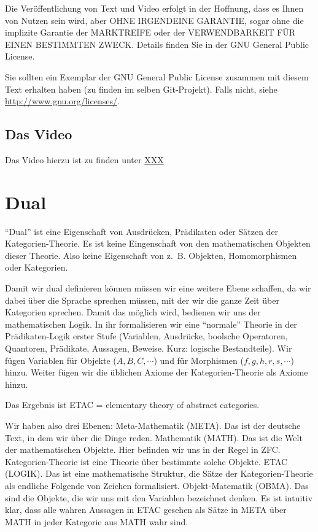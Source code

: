 \documentclass[a4paper]{amsart}
\theoremstyle{definition}
\newcommand{\zb}{z.~B. }
\begin{document}
Die Veröffentlichung von Text und Video erfolgt in der Hoffnung, dass es Ihnen von Nutzen sein wird,
aber OHNE IRGENDEINE GARANTIE, sogar ohne die implizite Garantie der MARKTREIFE oder der
VERWENDBARKEIT FÜR EINEN BESTIMMTEN ZWECK. Details finden Sie in der GNU General Public License.

Sie sollten ein Exemplar der GNU General Public License zusammen mit diesem Text erhalten haben
(zu finden im selben Git-Projekt).
Falls nicht, siehe \url{http://www.gnu.org/licenses/}.

\subsection*{Das Video}
Das Video hierzu ist zu finden unter
{\tiny
   \url{XXX}
}

\section{Dual}
"`Dual"' ist eine Eigenschaft von Ausdrücken, Prädikaten oder Sätzen der Kategorien-Theorie. Es ist keine Eingenschaft von den mathematischen Objekten dieser Theorie. Also keine Eigenschaft von \zb Objekten, Homomorphismen oder Kategorien.

Damit wir dual definieren können müssen wir eine weitere Ebene schaffen, da wir dabei über die Sprache sprechen müssen, mit der wir die ganze Zeit über Kategorien sprechen. Damit das möglich wird, bedienen wir uns der mathematischen Logik. In ihr formalisieren wir eine "`normale"' Theorie in der Prädikaten-Logik erster Stufe (Variablen, Ausdrücke, boolsche Operatoren, Quantoren, Prädikate, Aussagen, Beweise. Kurz: logische Bestandteile). Wir fügen Variablen für Objekte ($A,B,C, \cdots$) und für Morphismen ($f, g, h, r, s, \cdots$) hinzu. Weiter fügen wir die üblichen Axiome der Kategorien-Theorie als Axiome hinzu. 

Das Ergebnis ist ETAC = elementary theory of abstract categories. 

Wir haben also drei Ebenen: Meta-Mathematik (META). Das ist der deutsche Text, in dem wir über die Dinge reden. Mathematik (MATH). Das ist die Welt der mathematischen Objekte. Hier befinden wir uns in der Regel in ZFC. Kategorien-Theorie ist eine Theorie über bestimmte solche Objekte. ETAC (LOGIK). Das ist eine mathematische Struktur, die Sätze der Kategorien-Theorie als endliche Folgende von Zeichen formalisiert. Objekt-Matematik (OBMA). Das sind die Objekte, die wir uns mit den Variablen bezeichnet denken. Es ist intuitiv klar, dass alle wahren Aussagen in ETAC gesehen als Sätze in META über MATH in jeder Kategorie aus MATH wahr sind.
\end{document}

